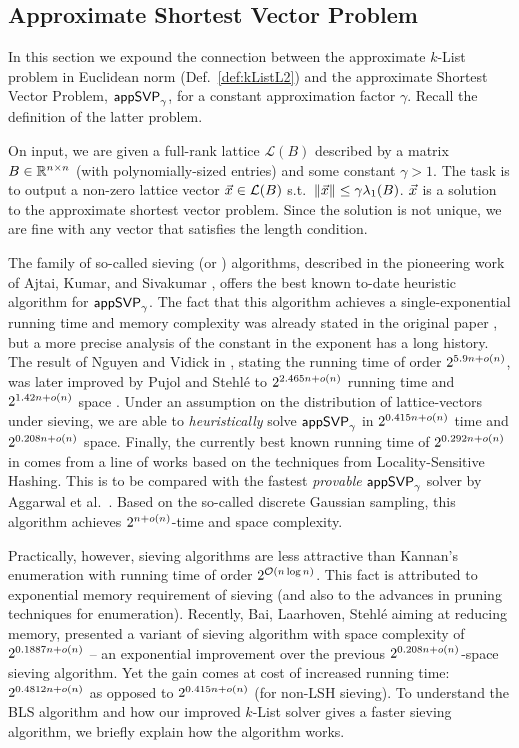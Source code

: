 \subsection{Approximate Shortest Vector Problem} \label{subsec:ApproxSVP}

In this section we expound the connection between the approximate $k$-List problem in Euclidean norm (Def.~\ref{def:kListL2}) and the approximate Shortest Vector Problem, $\textsf{appSVP}_{\gamma}$, for a constant approximation factor $\gamma$. Recall the definition of the latter problem.

On input, we are given a full-rank lattice $\mathcal{L}(B)$ described by a matrix $B \in {{\mathbb R}}^{n \times n}$ (with polynomially-sized entries) and some constant $\gamma > 1$. The task is to output a non-zero lattice vector $\vec x \in \mathcal{L}(B)$ s.t.\ $ \| \vec x \| \leq \gamma \lambda_1 (B)$. $\vec x$ is a solution to the approximate shortest vector problem. Since the solution is not unique, we are fine with any vector that satisfies the length condition.

The family of so-called sieving (or \AKS) algorithms, described in the pioneering work of Ajtai, Kumar, and Sivakumar \cite{STOC:AjtKumSiv01}, offers the best known to-date heuristic algorithm for $\textsf{appSVP}_{\gamma}$. The fact that this algorithm achieves a single-exponential running time and memory complexity was already stated in the original paper \cite{STOC:AjtKumSiv01}, but a more precise analysis of the constant in the exponent has a long history. The result of Nguyen and Vidick in \cite{NguVid08}, stating the running time of order $2^{5.9n + o(n)}$,  was later improved by Pujol and Stehl\'e to $2^{2.465n + o(n)}$ running time and $2^{1.42n + o(n)}$ space \cite{PujSte09}. Under an assumption on the distribution of lattice-vectors under sieving, we are able to \emph{heuristically} solve $\textsf{appSVP}_{\gamma}$ in $2^{0.415n + o(n)}$ time and $2^{0.208n + o(n)}$ space. Finally, the currently best known running time of  $2^{0.292n + o(n)}$ in \cite{SODA:BDGL16} comes from a line of works based on the techniques from Locality-Sensitive Hashing. This is to be compared with the fastest \emph{provable} $\textsf{appSVP}_{\gamma}$ solver by Aggarwal et al.\ \cite{STOC:ADRS15}. Based on the so-called discrete Gaussian sampling, this algorithm achieves $2^{n + o(n)}$-time and space complexity. 

Practically, however, sieving algorithms are less attractive than Kannan's enumeration with running time of order $2^{\mathcal{O}(n \log n)}$. This fact is attributed to exponential memory requirement of sieving (and also to the advances in pruning techniques for enumeration). Recently, Bai, Laarhoven, Stehl\'e aiming at reducing memory, presented a variant of sieving algorithm with space complexity of $2^{0.1887n+o(n)}$ -- an exponential improvement over the previous $2^{0.208n + o(n)}$-space sieving algorithm. Yet the gain comes at cost of increased running time: $2^{0.4812n + o(n)}$ as opposed to $2^{0.415n +o(n)}$ (for non-LSH sieving). To understand the BLS algorithm and how our improved $k$-List solver gives a faster sieving algorithm, we briefly explain how the \AKS algorithm works. 

